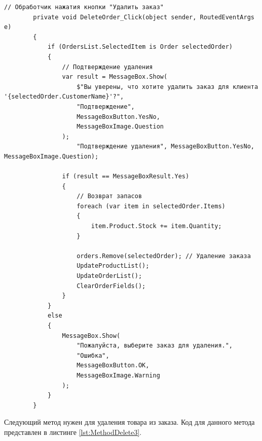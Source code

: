 \documentclass[12pt]{article}
\newcommand{\colorGIT}[1]{\textcolor{CtpGreen}{#1}}
\begin{document}
\begin{lstlisting}[style=csharp_catppuccin, caption=\colorGIT{\href{https://github.com/WebMasterIT/Csharp_Labs/blob/ec375afd16c0647b337cf3d8a79c8bef904fc1be/3lab/StoreManager/MainWindow.xaml.cs\#L268-L295}{Метод}} удаления заказа, label=lst:MethodDelete2]
        // Обработчик нажатия кнопки "Удалить заказ"
        private void DeleteOrder_Click(object sender, RoutedEventArgs e)
        {
            if (OrdersList.SelectedItem is Order selectedOrder)
            {
                // Подтверждение удаления
                var result = MessageBox.Show(
                    $"Вы уверены, что хотите удалить заказ для клиента '{selectedOrder.CustomerName}'?", 
                    "Подтверждение", 
                    MessageBoxButton.YesNo, 
                    MessageBoxImage.Question
                );
                    "Подтверждение удаления", MessageBoxButton.YesNo, MessageBoxImage.Question);

                if (result == MessageBoxResult.Yes)
                {
                    // Возврат запасов
                    foreach (var item in selectedOrder.Items)
                    {
                        item.Product.Stock += item.Quantity;
                    }

                    orders.Remove(selectedOrder); // Удаление заказа
                    UpdateProductList();
                    UpdateOrderList();
                    ClearOrderFields();
                }
            }
            else
            {
                MessageBox.Show(
                    "Пожалуйста, выберите заказ для удаления.", 
                    "Ошибка", 
                    MessageBoxButton.OK, 
                    MessageBoxImage.Warning
                );
            }
        }
\end{lstlisting}

\pagebreak

Следующий метод нужен для удаления товара из заказа. Код для данного метода представлен в листинге \ref{lst:MethodDelete3}.
\end{document}
